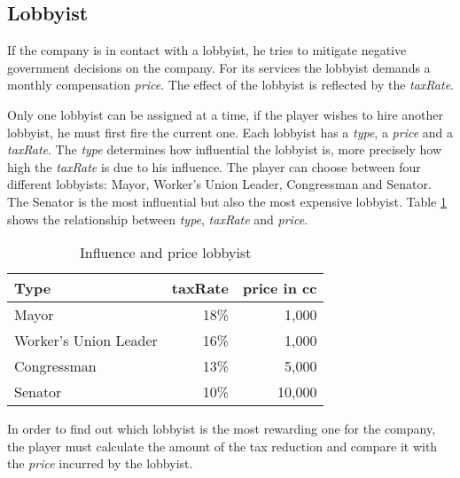 \subsection{Lobbyist} \label{lobbyist_simulation}

If the company is in contact with a lobbyist, he tries to mitigate negative government decisions on the company. For its services the lobbyist demands a monthly compensation \textit{price}. The effect of the lobbyist is reflected by the \textit{taxRate}. 

Only one lobbyist can be assigned at a time, if the player wishes to hire another lobbyist, he must first fire the current one. Each lobbyist has a \textit{type}, a \textit{price} and a \textit{taxRate}. The \textit{type} determines how influential the lobbyist is, more precisely how high the \textit{taxRate} is due to his influence. The player can choose between four different lobbyists: Mayor, Worker’s Union Leader, Congressman and Senator. The Senator is the most influential but also the most expensive lobbyist. Table \ref{influence_lobbyist} shows the relationship between \textit{type}, \textit{taxRate} and \textit{price}. 

\begin{table}[ht]
\centering
\begin{tabular}{|l|r|r|}
\hline
Type                    & taxRate   & price in cc \\ \hline
Mayor                   & 18\%      & 1,000     \\
Worker's Union Leader   & 16\%      & 1,000     \\
Congressman             & 13\%      & 5,000     \\
Senator                 & 10\%      & 10,000     \\
\hline
\end{tabular}
\caption{Influence and price lobbyist}
\label{influence_lobbyist}
\end{table}

In order to find out which lobbyist is the most rewarding one for the company, the player must calculate the amount of the tax reduction and compare it with the \textit{price} incurred by the lobbyist.
 



 




